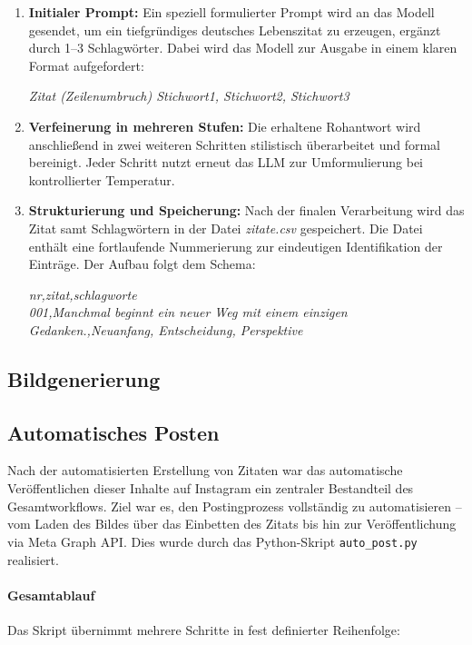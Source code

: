 \documentclass[a4paper,12pt]{article}
\begin{document}
\begin{enumerate}
    \item \textbf{Initialer Prompt:} Ein speziell formulierter Prompt wird an das Modell gesendet, um ein tiefgründiges deutsches Lebenszitat zu erzeugen, ergänzt durch 1–3 Schlagwörter. Dabei wird das Modell zur Ausgabe in einem klaren Format aufgefordert:

    \textit{Zitat (Zeilenumbruch) Stichwort1, Stichwort2, Stichwort3}

    \item \textbf{Verfeinerung in mehreren Stufen:} Die erhaltene Rohantwort wird anschließend in zwei weiteren Schritten stilistisch überarbeitet und formal bereinigt. Jeder Schritt nutzt erneut das LLM zur Umformulierung bei kontrollierter Temperatur.

    \item \textbf{Strukturierung und Speicherung:} Nach der finalen Verarbeitung wird das Zitat samt Schlagwörtern in der Datei \textit{zitate.csv} gespeichert. Die Datei enthält eine fortlaufende Nummerierung zur eindeutigen Identifikation der Einträge. Der Aufbau folgt dem Schema:

    \textit{nr,zitat,schlagworte} \\
    \textit{001,Manchmal beginnt ein neuer Weg mit einem einzigen Gedanken.,Neuanfang, Entscheidung, Perspektive}
\end{enumerate}

\subsection{Bildgenerierung}
\subsection{Automatisches Posten}

Nach der automatisierten Erstellung von Zitaten war das automatische Veröffentlichen dieser Inhalte auf Instagram ein zentraler Bestandteil des Gesamtworkflows. Ziel war es, den Postingprozess vollständig zu automatisieren – vom Laden des Bildes über das Einbetten des Zitats bis hin zur Veröffentlichung via Meta Graph API. Dies wurde durch das Python-Skript \texttt{auto\_post.py} realisiert.

\paragraph{Gesamtablauf}

Das Skript übernimmt mehrere Schritte in fest definierter Reihenfolge:
\end{document}

